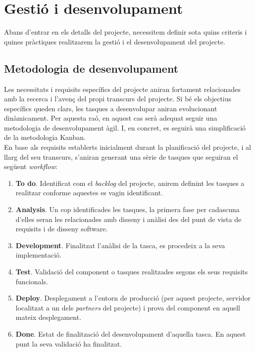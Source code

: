 
\chapter{Gestió i desenvolupament} %

\label{GestioIDesenvolupament} %

Abans d'entrar en els detalls del projecte, necessitem definir sota quins criteris i quines pràctiques realitzarem la gestió i el desenvolupament del projecte.


\section{Metodologia de desenvolupament}

Les necessitats i requisits específics del projecte aniran fortament relacionades amb la recerca i l’avenç del propi transcurs del projecte. Si bé els objectius específics queden clars, les tasques a desenvolupar aniran evolucionant dinàmicament. Per aquesta raó, en aquest cas serà adequat seguir una metodologia de desenvolupament àgil. I, en concret, es seguirà una simplificació de la metodologia Kanban. \\

En base als requisits establerts inicialment durant la planificació del projecte, i al llarg del seu transcurs, s’aniran generant una sèrie de tasques que seguiran el següent \textit{workflow}:

\begin{enumerate}
\item \textbf{To do}. Identificat com el \textit{backlog} del projecte, anirem definint les tasques a realitzar conforme aquestes es vagin identificant.
\item \textbf{Analysis}. Un cop identificades les tasques, la primera fase per cadascuna d'elles seran les relacionades amb disseny i anàlisi des del punt de vista de requisits i de disseny software.
\item \textbf{Development}. Finalitzat l'anàlisi de la tasca, es procedeix a la seva implementació.
\item \textbf{Test}. Validació del component o tasques realitzades segons els seus requisits funcionals.
\item \textbf{Deploy}. Desplegament a l'entorn de producció (per aquest projecte, servidor localitzat a un dels \textit{partners} del projecte) i prova del component en aquell mateix desplegament.
\item \textbf{Done}. Estat de finalització del desenvolupament d'aquella tasca. En aquest punt la seva validació ha finalitzat.
\end{enumerate}

